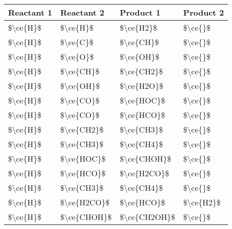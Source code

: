 \begin{tabular}{llll}
\toprule
         Reactant 1 &            Reactant 2 &            Product 1 &         Product 2 \\
\midrule
   \$\textbackslash ce\{H\}\$ &      \$\textbackslash ce\{H\}\$ &     \$\textbackslash ce\{H2\}\$ &    \$\textbackslash ce\{\}\$ \\
   \$\textbackslash ce\{H\}\$ &      \$\textbackslash ce\{C\}\$ &     \$\textbackslash ce\{CH\}\$ &    \$\textbackslash ce\{\}\$ \\
   \$\textbackslash ce\{H\}\$ &      \$\textbackslash ce\{O\}\$ &     \$\textbackslash ce\{OH\}\$ &    \$\textbackslash ce\{\}\$ \\
   \$\textbackslash ce\{H\}\$ &     \$\textbackslash ce\{CH\}\$ &    \$\textbackslash ce\{CH2\}\$ &    \$\textbackslash ce\{\}\$ \\
   \$\textbackslash ce\{H\}\$ &     \$\textbackslash ce\{OH\}\$ &    \$\textbackslash ce\{H2O\}\$ &    \$\textbackslash ce\{\}\$ \\
   \$\textbackslash ce\{H\}\$ &     \$\textbackslash ce\{CO\}\$ &    \$\textbackslash ce\{HOC\}\$ &    \$\textbackslash ce\{\}\$ \\
   \$\textbackslash ce\{H\}\$ &     \$\textbackslash ce\{CO\}\$ &    \$\textbackslash ce\{HCO\}\$ &    \$\textbackslash ce\{\}\$ \\
   \$\textbackslash ce\{H\}\$ &    \$\textbackslash ce\{CH2\}\$ &    \$\textbackslash ce\{CH3\}\$ &    \$\textbackslash ce\{\}\$ \\
   \$\textbackslash ce\{H\}\$ &    \$\textbackslash ce\{CH3\}\$ &    \$\textbackslash ce\{CH4\}\$ &    \$\textbackslash ce\{\}\$ \\
   \$\textbackslash ce\{H\}\$ &    \$\textbackslash ce\{HOC\}\$ &   \$\textbackslash ce\{CHOH\}\$ &    \$\textbackslash ce\{\}\$ \\
   \$\textbackslash ce\{H\}\$ &    \$\textbackslash ce\{HCO\}\$ &   \$\textbackslash ce\{H2CO\}\$ &    \$\textbackslash ce\{\}\$ \\
   \$\textbackslash ce\{H\}\$ &    \$\textbackslash ce\{CH3\}\$ &    \$\textbackslash ce\{CH4\}\$ &    \$\textbackslash ce\{\}\$ \\
   \$\textbackslash ce\{H\}\$ &   \$\textbackslash ce\{H2CO\}\$ &    \$\textbackslash ce\{HCO\}\$ &  \$\textbackslash ce\{H2\}\$ \\
   \$\textbackslash ce\{H\}\$ &   \$\textbackslash ce\{CHOH\}\$ &  \$\textbackslash ce\{CH2OH\}\$ &    \$\textbackslash ce\{\}\$ \\

\end{tabular}
